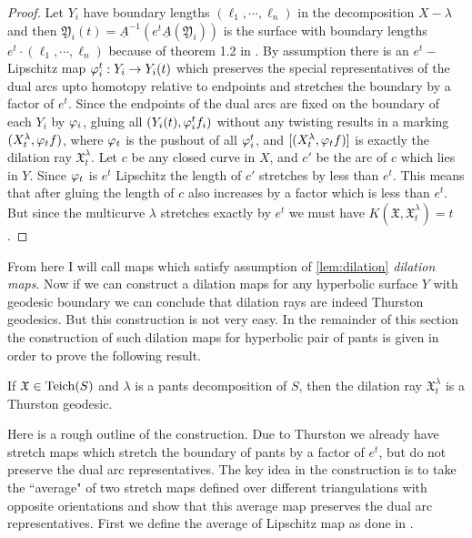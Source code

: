 \begin{proof}
  Let $Y_i$ have boundary lengths $(\ell_1, \cdots, \ell_n)$ in the decomposition $X-\lambda$ and then $ \mathfrak{Y}_i(t) = \underline{A}^{-1}(e^t\underline{A}( \mathfrak{Y}_i))$ is the surface with boundary lengths $e^t\cdot(\ell_1,\cdots,\ell_n)$ because of theorem 1.2 in \cite{luo}. By assumption there is an $e^t-$Lipschitz map $\varphi_i^t:Y_i\to Y_i(t)$ which preserves the special representatives of the dual arcs upto homotopy relative to endpoints and stretches the boundary by a factor of $e^t$. Since the endpoints of the dual arcs are fixed on the boundary of each $Y_i$ by $\varphi_i$, gluing all $(Y_i(t), \varphi_i^t f_i)$ without any twisting results in a marking $(X^\lambda_t,\varphi_t f)$, where $\varphi_t$ is the pushout of all $\varphi^t_i$, and $[(X^\lambda_t, \varphi_tf)]$ is exactly the dilation ray $ \mathfrak{X}^\lambda_t$. 
  Let $c$ be any closed curve in $X$, and $c'$ be the arc of $c$ which lies in $Y$. Since $\varphi_t$ is $e^t$ Lipschitz the length of $c'$ stretches by less than $e^t$. This means that after gluing the length of $c$ also increases by a factor which is less than $e^t$. But since the multicurve $\lambda$ stretches exactly by $e^t$ we must have $K( \mathfrak{X}, \mathfrak{X}^\lambda_t) = t$.
\end{proof}
From here I will call maps which satisfy assumption of \ref{lem:dilation} \textit{dilation maps}. Now if we can construct a dilation maps for any hyperbolic surface $Y$ with geodesic boundary we can conclude that dilation rays are indeed Thurston geodesics. But this construction is not very easy. In the remainder of this section the construction of such dilation maps for hyperbolic pair of pants is given in order to prove the following result.
\begin{theorem}\label{thm:main}
  If $ \mathfrak{X}\in \text{Teich}(S)$ and $\lambda$ is a pants decomposition of $S$, then the dilation ray $ \mathfrak{X}^\lambda_t$ is a Thurston geodesic.
\end{theorem}
Here is a rough outline of the construction. Due to Thurston we already have stretch maps which stretch the boundary of pants by a factor of $e^t$, but do not preserve the dual arc representatives. The key idea in the construction is to take the ``average" of two stretch maps defined over different triangulations with opposite orientations and show that this average map preserves the dual arc representatives. First we define the average of Lipschitz map as done in \cite{kassel}.
